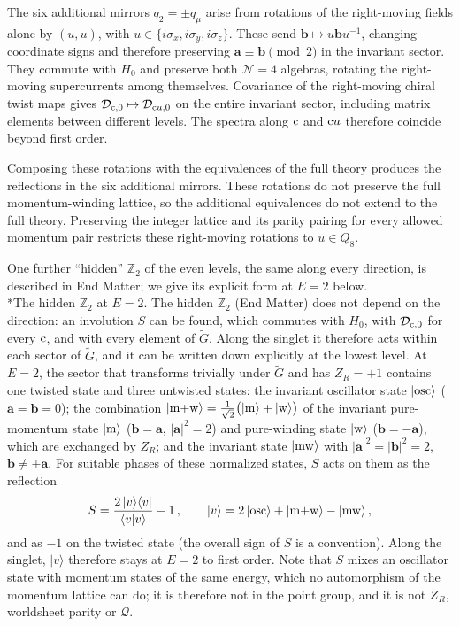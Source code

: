 \documentclass[aps,onecolumn,groupedaddress,nofootinbib,pra]{revtex4-2}
\makeatletter
\renewcommand\paragraph{\@startsection{paragraph}{4}{\parindent}{\z@}{-1em}{\normalfont\normalsize\bfseries}}
\newcommand{\Def}{\mathcal D}
\newcommand{\cMat}{{\rm c}}
\newcommand{\Gt}{\widetilde G}
\newcommand{\ba}{\mathbf a}
\newcommand{\bb}{\mathbf b}
\newcommand{\Dcz}{\Def_{\cMat,0}}
\makeatother
\begin{document}
The six additional mirrors $q_2=\pm q_\mu$ arise from rotations of the right-moving fields alone by $(u,u)$, with $u\in\{i\sigma_x,i\sigma_y,i\sigma_z\}$. These send $\bb\mapsto u\bb u^{-1}$, changing coordinate signs and therefore preserving $\ba\equiv\bb\pmod2$ in the invariant sector. They commute with $H_0$ and preserve both $\mathcal N=4$ algebras, rotating the right-moving supercurrents among themselves. Covariance of the right-moving chiral twist maps gives $\Dcz\mapsto\mathcal D_{\cMat u,0}$ on the entire invariant sector, including matrix elements between different levels. The spectra along $\cMat$ and $\cMat u$ therefore coincide beyond first order.

Composing these rotations with the equivalences of the full theory produces the reflections in the six additional mirrors. These rotations do not preserve the full momentum-winding lattice, so the additional equivalences do not extend to the full theory. Preserving the integer lattice and its parity pairing for every allowed momentum pair restricts these right-moving rotations to $u\in Q_8$.

One further ``hidden'' $\mathbb Z_2$ of the even levels, the same along every direction, is described in End Matter; we give its explicit form at $E=2$ below.\\

\paragraph*{The hidden $\mathbb Z_2$ at $E=2$.}
The hidden $\mathbb Z_2$ (End Matter) does not depend on the direction: an involution $S$ can be found, which commutes with $H_0$, with $\Dcz$ for every $\cMat$, and with every element of $\Gt$. Along the singlet it therefore acts within each sector of $\Gt$, and it can be written down explicitly at the lowest level. At $E=2$, the sector that transforms trivially under $\Gt$ and has $Z_R=+1$ contains one twisted state and three untwisted states: the invariant oscillator state $|{\rm osc}\rangle$ ($\ba=\bb=0$); the combination $|{\rm m}{+}{\rm w}\rangle=\frac1{\sqrt2}\big(|{\rm m}\rangle+|{\rm w}\rangle\big)$ of the invariant pure-momentum state $|{\rm m}\rangle$ ($\bb=\ba$, $|\ba|^2=2$) and pure-winding state $|{\rm w}\rangle$ ($\bb=-\ba$), which are exchanged by $Z_R$; and the invariant state $|{\rm mw}\rangle$ with $|\ba|^2=|\bb|^2=2$, $\bb\neq\pm\ba$. For suitable phases of these normalized states, $S$ acts on them as the reflection
\begin{equation}\label{eq:Sreflection}
S=\frac{2\,|v\rangle\langle v|}{\langle v|v\rangle}-1\,,\qquad |v\rangle=2\,|{\rm osc}\rangle+|{\rm m}{+}{\rm w}\rangle-|{\rm mw}\rangle\,,
\end{equation}
and as $-1$ on the twisted state (the overall sign of $S$ is a convention). Along the singlet, $|v\rangle$ therefore stays at $E=2$ to first order. Note that $S$ mixes an oscillator state with momentum states of the same energy, which no automorphism of the momentum lattice can do; it is therefore not in the point group, and it is not $Z_R$, worldsheet parity or $\mathcal Q$.\\
\end{document}
